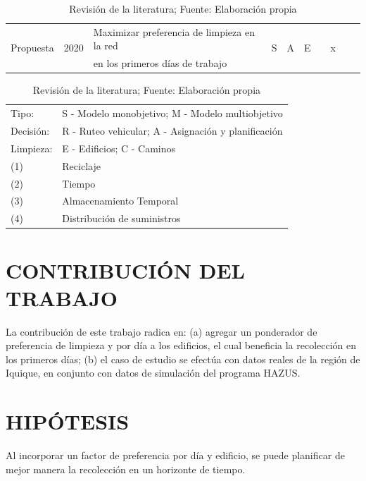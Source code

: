 \documentclass[12pt,a4paper]{article}
\begin{document}
\begin{table}[h!]
{\begin{tabular}{l|c|l|c|c|c|c|c|c|c}
\multirow{2}{*}{Propuesta} & \multirow{2}{*}{2020} & Maximizar preferencia de limpieza en la red                        & \multirow{2}{*}{S} & \multirow{2}{*}{A} & \multirow{2}{*}{E} & \multirow{2}{*}{} & \multirow{2}{*}{x}  & \multirow{2}{*}{} & \multirow{2}{*}{} \\
& & en los primeros días de trabajo & & & & & & & \\ \hline
\end{tabular}
}

\resizebox{8cm}{!} {
\begin{tabular}{ l l }
\\
Tipo: 	& S - Modelo monobjetivo; M - Modelo multiobjetivo \\
Decisión: & R - Ruteo vehicular; A - Asignación y planificación \\
Limpieza: & E - Edificios; C - Caminos \\
(1)		& Reciclaje \\
(2)		& Tiempo \\
(3)		& Almacenamiento Temporal \\
(4)		& Distribución de suministros 
\end{tabular}
}
\caption{Revisión de la literatura; Fuente: Elaboración propia}
\label{tab:tabla1}
\end{table}




\section{CONTRIBUCIÓN DEL TRABAJO}

La contribución de este trabajo radica en: (a) agregar un ponderador de preferencia de limpieza y por día a los edificios, el cual beneficia la recolección en los primeros días; (b) el caso de estudio se efectúa con datos reales de la región de Iquique, en conjunto con datos de simulación del programa HAZUS. 

\section{HIPÓTESIS}

Al incorporar un factor de preferencia por día y edificio, se puede planificar de mejor manera la recolección en un horizonte de tiempo.
\end{document}
